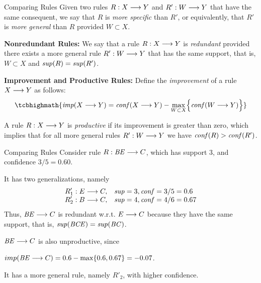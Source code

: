 \begin{frame}{Comparing Rules}
Given two rules $R: X \arule Y$ and $R': W \arule Y$ that have the same
consequent, we say that $R$ is {\em more specif\/{i}c} than $R'$, or
equivalently, that $R'$ is {\em more general} than $R$
provided $W \subset X$.

\medskip
{\bf Nonredundant Rules:} We say that a rule $R: X \arule Y$
is {\em redundant} provided there exists a more general rule
$R': W \arule Y$ that has the same support, that is, $W\subset X$ and $\mathit{sup}(R) = \mathit{sup}(R')$.

\medskip
{\bf Improvement and Productive Rules:}
Def\/{i}ne the {\em improvement}
of
a rule $X \arule Y$ as follows:
\begin{align*}
\tcbhighmath{
\textit{imp}(X \arule Y) = \conff (X \arule Y)
- \max_{W \subset X} \Bigl\{\conff (W \arule Y) \Bigr\}
}
\end{align*}

\medskip
A rule $R: X \arule Y$ is {\em productive} if
its improvement is greater than zero, which implies that
for all more general rules $R': W \arule
Y$ we have  $\mathit{conf}(R) > \mathit{conf}(R')$. 
\end{frame}

\begin{frame}{Comparing Rules}
Consider
rule $R: \mathit{BE} \arule C$, which has support $3$, and conf\/{i}dence $3/5
= 0.60$.

It has two generalizations, namely
\begin{alignat*}{2}
R'_1: E \arule C,& \quad \supp= 3, \conff = 3/5=0.6\\[-3pt]
R'_2: B \arule C,& \quad \supp= 4, \conff = 4/6 =0.67
\end{alignat*}
Thus, $\mathit{BE} \arule C$ is redundant w.r.t. $E \arule C$ because they
have the same support, that is, $\mathit{sup}(\mathit{BCE}) = \mathit{sup}(\mathit{BC})$. 

\medskip

$\mathit{BE} \arule C$ is also unproductive,
since 

\medskip


$imp(\mathit{BE} \arule C) = 0.6 - \max\{0.6, 0.67\} = -0.07$. 

\medskip


It has a
more general rule, namely $R'_2$, with higher conf\/{i}dence.


\end{frame}



